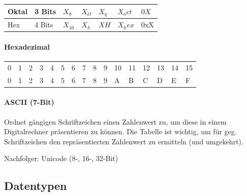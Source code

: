		\begin{tabular}{|l|llllll|}
			\hline
			Oktal & 3 Bits & $X_8$ & $X_O$ & $X_q$ & $X_oct$ & $0X$ \\
			\hline
			Hex & 4 Bits   & $X_16$ & $X_h$ & $XH$ & $X_hex$ & 0xX \\
			\hline
		\end{tabular}

		\paragraph{Hexadezimal}
			\begin{tabular}{llllllllllllllll}
				0 & 1 & 2 & 3 & 4 & 5 & 6 & 7 & 8 & 9 & 10 & 11 & 12 & 13 & 14 & 15 \\
				0 & 1 & 2 & 3 & 4 & 5 & 6 & 7 & 8 & 9 & A & B & C & D & E & F \\
			\end{tabular}
			
		\paragraph{ASCII (7-Bit)}
			
			Ordnet gängigen Schriftzeichen einen Zahlenwert zu, um diese in einem Digitalrechner präsentieren zu können.
			Die Tabelle ist wichtig, um für geg. Schriftzeichen den repräsentierten Zahlenwert zu ermitteln (und umgekehrt).

			Nachfolger: Unicode (8-, 16-, 32-Bit)
	
	\subsection{Datentypen}
